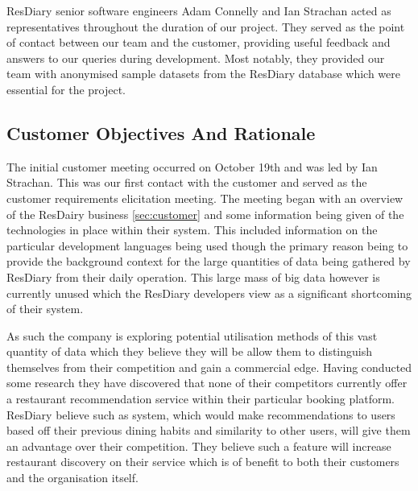 \documentclass{l3proj}
\begin{document}
ResDiary senior software engineers Adam Connelly and Ian Strachan acted as representatives throughout the duration of our project. They served as the point of contact between our team and the customer, providing useful feedback and answers to our queries during development. Most notably, they provided our team with anonymised sample datasets from the ResDiary database which were essential for the project.


\subsection{Customer Objectives And Rationale}
\label{sec:custobjectives}


The initial customer meeting occurred on October 19th and was led by Ian Strachan. This was our first contact with the customer and served as the customer requirements elicitation meeting. The meeting began with an overview of the ResDairy business \ref{sec:customer} and some information being given of the technologies in place within their system. This included information on the particular development languages being used though the primary reason being to provide the background context for the large quantities of data being gathered by ResDiary from their daily operation. This large mass of big data however is currently unused which the ResDiary developers view as a significant shortcoming of their system. 

As such the company is exploring potential utilisation methods of this vast quantity of data which they believe they will be allow them to distinguish themselves from their competition and gain a commercial edge. Having conducted some research they have discovered that none of their competitors currently offer a restaurant recommendation service within their particular booking platform. ResDiary believe such as system, which would make recommendations to users based off their previous dining habits and similarity to other users, will give them an advantage over their competition. They believe such a feature will increase restaurant discovery on their service which is of benefit to both their customers and the organisation itself.
\end{document}
